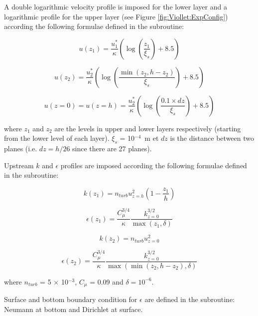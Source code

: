 A double logarithmic velocity profile is imposed for the lower layer and
a logarithmic profile for the upper layer
(see Figure \ref{fig:Viollet:ExpConfig}) according
the following formulae defined in the  subroutine:

\begin{equation}
  u(z_1) = \frac{u_1^*}{\kappa}\left( \log \left( \frac{z_1}{\xi_s}\right) + 8.5 \right)
\end{equation}

\begin{equation}
  u(z_2) = \frac{u_2^*}{\kappa}\left( \log \left( \frac{\min(z_2, h-z_2)}{\xi_s}\right) + 8.5 \right)
\end{equation}

\begin{equation}
  u(z=0) = u(z=h) = \frac{u_2^*}{\kappa}\left( \log \left( \frac{0.1 \times dz}{\xi_s}\right) + 8.5 \right)
\end{equation}

where $z_1$ and $z_2$ are the levels in upper and lower layers
respectively (starting from the lower level of each layer).
$\xi_s$ = 10$^{-4}$~m et $dz$ is the distance between two planes
(i.e. $dz = h/26$ since there are 27 planes).

Upstream $k$ and $\epsilon$ profiles are imposed according the following
formulae defined in the  subroutine:

\begin{equation}
  k(z_1) = n_{turb} u_{z=h}^{2} \left( 1-\frac{z_1}{h}\right)
\end{equation}

\begin{equation}
  \epsilon(z_1) = \frac{C_\mu^{3/4}}{\kappa} \frac{k_{z=0}^{3/2}}{\max(z_1, \delta)}
\end{equation}

\begin{equation}
  k(z_2) = n_{turb} u_{z=0}^{2}
\end{equation}

\begin{equation}
  \epsilon(z_2) = \frac{C_\mu^{3/4}}{\kappa} \frac{k_{z=0}^{3/2}}{\max(\min(z_2,h-z_2), \delta)}
\end{equation}

where $n_{turb}$ = 5 $\times$ 10$^{-3}$, $C_\mu$ = 0.09 and
$\delta = 10^{-6}$.

Surface and bottom boundary condition for $\epsilon$ are defined in the
 subroutine: Neumann at bottom and Dirichlet at surface.

